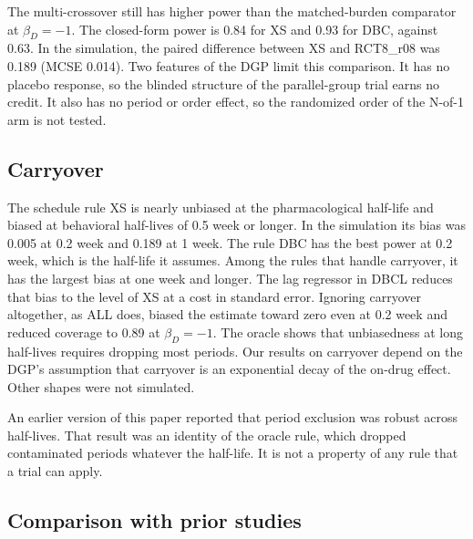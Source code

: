 \documentclass[
  11pt,
]{article}
\begin{document}
The multi-crossover still has higher power than the matched-burden comparator at \(\beta_D = -1\). The closed-form power is 0.84 for XS and 0.93 for DBC, against 0.63. In the simulation, the paired difference between XS and RCT8\_r08 was 0.189 (MCSE 0.014). Two features of the DGP limit this comparison. It has no placebo response, so the blinded structure of the parallel-group trial earns no credit. It also has no period or order effect, so the randomized order of the N-of-1 arm is not tested.

\subsection{Carryover}\label{carryover}

The schedule rule XS is nearly unbiased at the pharmacological half-life and biased at behavioral half-lives of 0.5 week or longer. In the simulation its bias was 0.005 at 0.2 week and 0.189 at 1 week. The rule DBC has the best power at 0.2 week, which is the half-life it assumes. Among the rules that handle carryover, it has the largest bias at one week and longer. The lag regressor in DBCL reduces that bias to the level of XS at a cost in standard error. Ignoring carryover altogether, as ALL does, biased the estimate toward zero even at 0.2 week and reduced coverage to 0.89 at \(\beta_D = -1\). The oracle shows that unbiasedness at long half-lives requires dropping most periods. Our results on carryover depend on the DGP's assumption that carryover is an exponential decay of the on-drug effect. Other shapes were not simulated.

An earlier version of this paper reported that period exclusion was robust across half-lives. That result was an identity of the oracle rule, which dropped contaminated periods whatever the half-life. It is not a property of any rule that a trial can apply.

\subsection{Comparison with prior studies}\label{comparison-with-prior-studies}
\end{document}
